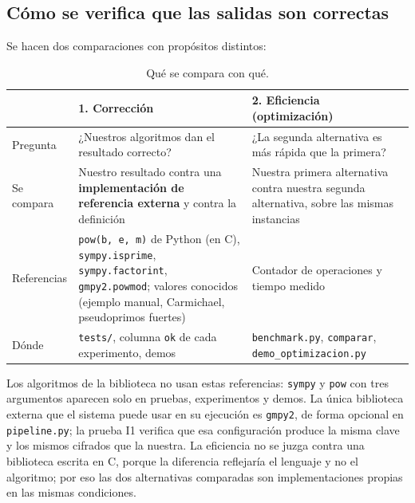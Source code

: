 

\subsection{Cómo se verifica que las salidas son correctas}

Se hacen dos comparaciones con propósitos distintos:

\begin{table}[H]
\centering\small
\caption{Qué se compara con qué.}
\label{tab:comparaciones}
\renewcommand{\arraystretch}{1.25}
\begin{tabularx}{\linewidth}{@{}R{2.5cm} Y Y@{}}
\toprule
& \textbf{1. Corrección} & \textbf{2. Eficiencia (optimización)}\\
\midrule
Pregunta & ¿Nuestros algoritmos dan el resultado correcto? & ¿La segunda alternativa es más rápida que la primera?\\
Se compara & Nuestro resultado contra una \textbf{implementación de referencia externa} y contra la definición & Nuestra primera alternativa contra nuestra segunda alternativa, sobre las mismas instancias\\
Referencias & \texttt{pow(b, e, m)} de Python (en C), \texttt{sympy.isprime}, \texttt{sympy.factorint}, \texttt{gmpy2.powmod}; valores conocidos (ejemplo manual, Carmichael, pseudoprimos fuertes) & Contador de operaciones y tiempo medido\\
Dónde & \texttt{tests/}, columna \texttt{ok} de cada experimento, demos & \texttt{benchmark.py}, \texttt{comparar}, \texttt{demo\_optimizacion.py}\\
\bottomrule
\end{tabularx}
\end{table}

Los algoritmos de la biblioteca no usan estas referencias: \texttt{sympy} y
\texttt{pow} con tres argumentos aparecen solo en pruebas, experimentos y demos.
La única biblioteca externa que el sistema puede usar en su ejecución es
\texttt{gmpy2}, de forma opcional en \texttt{pipeline.py}; la prueba I1 verifica
que esa configuración produce la misma clave y los mismos cifrados que la
nuestra. La eficiencia no se juzga contra una biblioteca escrita en C, porque la
diferencia reflejaría el lenguaje y no el algoritmo; por eso las dos alternativas
comparadas son implementaciones propias en las mismas condiciones.

